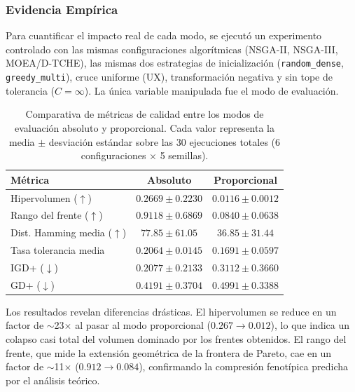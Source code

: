 \documentclass[a4paper,10pt]{article}
\begin{document}
\subsubsection{Evidencia Empírica}

Para cuantificar el impacto real de cada modo, se ejecutó un experimento controlado con las mismas configuraciones algorítmicas (NSGA-II, NSGA-III, MOEA/D-TCHE), las mismas dos estrategias de inicialización (\texttt{random\_dense}, \texttt{greedy\_multi}), cruce uniforme (UX), transformación negativa y sin tope de tolerancia ($C = \infty$). La única variable manipulada fue el modo de evaluación.

\begin{table}[H]
\centering
\caption{Comparativa de métricas de calidad entre los modos de evaluación absoluto y proporcional. Cada valor representa la media $\pm$ desviación estándar sobre las 30 ejecuciones totales (6 configuraciones $\times$ 5 semillas).}
\label{tab:abs_vs_prop}
\begin{tabular}{l c c}
\toprule
\textbf{Métrica} & \textbf{Absoluto} & \textbf{Proporcional} \\
\midrule
Hipervolumen ($\uparrow$) & $0.2669 \pm 0.2230$ & $0.0116 \pm 0.0012$ \\
Rango del frente ($\uparrow$) & $0.9118 \pm 0.6869$ & $0.0840 \pm 0.0638$ \\
Dist. Hamming media ($\uparrow$) & $77.85 \pm 61.05$ & $36.85 \pm 31.44$ \\
Tasa tolerancia media & $0.2064 \pm 0.0145$ & $0.1691 \pm 0.0597$ \\
IGD+ ($\downarrow$) & $0.2077 \pm 0.2133$ & $0.3112 \pm 0.3660$ \\
GD+ ($\downarrow$) & $0.4191 \pm 0.3704$ & $0.4991 \pm 0.3388$ \\
\bottomrule
\end{tabular}
\end{table}

Los resultados revelan diferencias drásticas. El hipervolumen se reduce en un factor de $\sim$23$\times$ al pasar al modo proporcional ($0.267 \rightarrow 0.012$), lo que indica un colapso casi total del volumen dominado por los frentes obtenidos. El rango del frente, que mide la extensión geométrica de la frontera de Pareto, cae en un factor de $\sim$11$\times$ ($0.912 \rightarrow 0.084$), confirmando la compresión fenotípica predicha por el análisis teórico.
\end{document}

